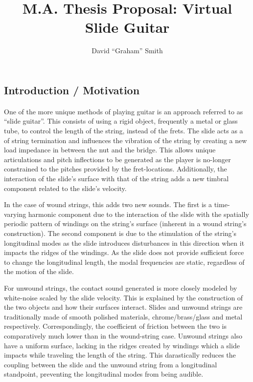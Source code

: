 \documentclass[12pt]{article}
\title{\Large{M.A. Thesis Proposal: Virtual Slide Guitar}}
\author{David ``Graham'' Smith}
\begin{document}
\maketitle

\subsection*{Introduction / Motivation}
\paragraph{}
One of the more unique methods of playing guitar is an approach referred to as “slide guitar”. This consists of using a rigid object, frequently a metal or glass tube, to control the length of the string, instead of the frets. The slide acts as a of string termination and influences the vibration of the string by creating a new load impedance in between the nut and the bridge. This allows unique articulations and pitch inflections to be generated as the player is no-longer constrained to the pitches provided by the fret-locations. Additionally, the interaction of the slide’s surface with that of the string adds a new timbral component related to the slide’s velocity. 

In the case of wound strings, this adds two new sounds. The first is a time-varying harmonic component due to the interaction of the slide with the spatially periodic pattern of windings on the string’s surface (inherent in a wound string’s construction).  The second component is due to the stimulation of the string’s longitudinal modes as the slide introduces disturbances in this direction when it impacts the ridges of the windings. As the slide does not provide sufficient force to change the longitudinal length, the modal frequencies are static, regardless of the motion of the slide. 

For unwound strings, the contact sound generated is more closely modeled by white-noise scaled by the slide velocity. This is explained by the construction of the two objects and how their surfaces interact. Slides and unwound strings are traditionally made of smooth polished materials, chrome/brass/glass and metal respectively. Correspondingly, the coefficient of friction between the two is comparatively much lower than in the wound-string case. Unwound strings also have a uniform surface, lacking in the ridges created by windings which a slide impacts while traveling the length of the string. This darastically reduces the coupling between the slide and the unwound string from a longitudinal standpoint, preventing the longitudinal modes from being audible.
\end{document}
